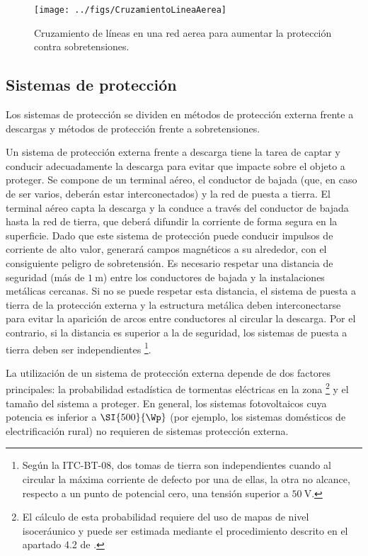 %
\begin{figure}


\texttt{[image: ../figs/CruzamientoLineaAerea]}

\caption{Cruzamiento de líneas en una red aerea para aumentar la protección
contra sobretensiones.\label{fig:CruzamientoLineas}}



\end{figure}



\subsection{Sistemas de protección}

Los sistemas de protección se dividen en métodos de protección externa
frente a descargas y métodos de protección frente a sobretensiones.

Un sistema de protección externa frente a descarga tiene la tarea
de captar y conducir adecuadamente la descarga para evitar que impacte
sobre el objeto a proteger. Se compone de un terminal aéreo, el conductor
de bajada (que, en caso de ser varios, deberán estar interconectados)
y la red de puesta a tierra. El terminal aéreo capta la descarga y
la conduce a través del conductor de bajada hasta la red de tierra,
que deberá difundir la corriente de forma segura en la superficie.
Dado que este sistema de protección puede conducir impulsos de corriente
de alto valor, generará campos magnéticos a su alrededor, con el consiguiente
peligro de sobretensión. Es necesario respetar una distancia de seguridad
(más de $\SI{1}{\meter}$) entre los conductores de bajada y la instalaciones
metálicas cercanas. Si no se puede respetar esta distancia, el sistema
de puesta a tierra de la protección externa y la estructura metálica
deben interconectarse para evitar la aparición de arcos entre conductores
al circular la descarga. Por el contrario, si la distancia es superior
a la de seguridad, los sistemas de puesta a tierra deben ser independientes%
\footnote{Según la ITC-BT-08, dos tomas de tierra son independientes cuando
al circular la máxima corriente de defecto por una de ellas, la otra
no alcance, respecto a un punto de potencial cero, una tensión superior
a $\SI{50}{\volt}$.%
}.

La utilización de un sistema de protección externa depende de dos
factores principales: la probabilidad estadística de tormentas eléctricas
en la zona%
\footnote{El cálculo de esta probabilidad requiere del uso de mapas de nivel
isoceráunico y puede ser estimada mediante el procedimiento descrito
en el apartado 4.2 de \cite{Becker.Vaaben.ea2000}.%
} y el tamaño del sistema a proteger. En general, los sistemas fotovoltaicos
cuya potencia es inferior a $\SI{500}{\Wp}$ (por ejemplo, los
sistemas domésticos de electrificación rural) no requieren de sistemas
protección externa. 

